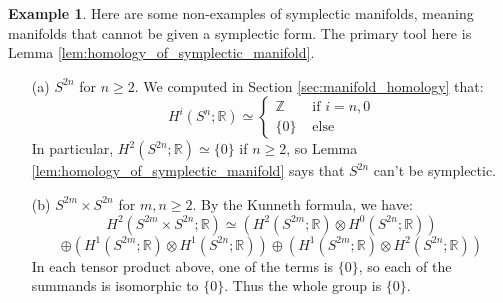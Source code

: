 \documentclass[12pt]{article}
\theoremstyle{definition}
\newtheorem{example}[theorem]{Example}
\numberwithin{equation}{section}
\newcommand{\R}{{\mathbb R}}
\newcommand{\Z}{{\mathbb Z}}
\begin{document}
\begin{example} Here are some non-examples of symplectic manifolds, meaning manifolds that cannot be given a symplectic form. The primary tool here is Lemma \ref{lem:homology_of_symplectic_manifold}.
\begin{enumerate}
	\item[(a)] $S^{2n}$ for $n \ge 2$. We computed in Section \ref{sec:manifold_homology} that:
	\[
	H^i(S^n;\R) \simeq \left\{\begin{array}{cc} \Z & \text{ if }i = n,0\\ \{0\} & \text{ else }\end{array}\right.
	\]
	In particular, $H^2(S^{2n};\R) \simeq \{0\}$ if $n \ge 2$, so Lemma \ref{lem:homology_of_symplectic_manifold} says that $S^{2n}$ can't be symplectic.
	\item[(b)] $S^{2m} \times S^{2n}$ for $m,n \ge 2$. By the Kunneth formula, we have:
	\[
	H^2(S^{2m} \times S^{2n};\R) \simeq (H^2(S^{2m};\R) \otimes H^0(S^{2n};\R))\]
	\[ \oplus (H^1(S^{2m};\R) \otimes H^1(S^{2n};\R)) \oplus (H^1(S^{2m};\R) \otimes H^2(S^{2n};\R))
	\]
	In each tensor product above, one of the terms is $\{0\}$, so each of the summands is isomorphic to $\{0\}$. Thus the whole group is $\{0\}$.
\end{enumerate}
\end{example}
\end{document}

